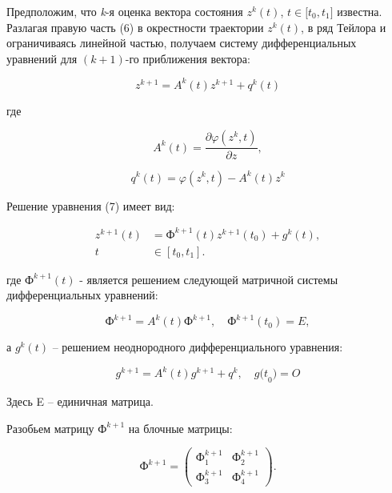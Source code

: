 \begin{multicols}{2}
Предположим, что \emph{k}-я оценка вектора состояния
\(z^{k}(t)\),
\(t \in \lbrack t_{0},t_{1}\rbrack\) известна. Разлагая правую часть (6)
в окрестности траектории \(z^{k}(t)\), в ряд
Тейлора и ограничиваясь линейной частью, получаем систему
дифференциальных уравнений для \((k + 1)\)-го приближения вектора:

\begin{equation}
{z}^{k + 1} = A^{k}(t)z^{k + 1} + q^{k}(t)
\end{equation}

где

\begin{equation*}
A^{k}(t) = \frac{\partial\varphi(z^{k},t)}{\partial z},
\end{equation*}

\begin{equation*}
q^{k}(t) = \varphi\left( z^{k},t \right) - A^{k}(t)z^{k}
\end{equation*}

Решение уравнения (7) имеет вид:

\begin{equation}
\begin{aligned}
z^{k + 1}(t) &= \text{Ф}^{k + 1}(t)z^{k + 1}\left( t_{0} \right) + g^{k}(t), \\
t &\in \left\lbrack t_{0}, t_{1} \right\rbrack.
\end{aligned}
\end{equation}

где \(Ф^{k + 1}(t)\) - является решением
следующей матричной системы дифференциальных уравнений:

\begin{equation}
{\text{Ф}}^{k + 1} = A^{k}(t)\text{Ф}^{k + 1},\quad \text{Ф}^{k + 1}\left( t_{0} \right) = E,
\end{equation}

а \(g^{k}(t)\) -- решением неоднородного
дифференциального уравнения:

\begin{equation}
{g}^{k + 1} = A^{k}(t)g^{k + 1} + q^{k},\quad {g(t}_{0}) = O
\end{equation}

Здесь E -- единичная матрица.

Разобьем матрицу \(\text{Ф}^{k + 1}\) на блочные
матрицы:

\[\text{Ф}^{k + 1} = \begin{pmatrix}
\text{Ф}_{1}^{k + 1} & \text{Ф}_{2}^{k + 1} \\
\text{Ф}_{3}^{k + 1} & \text{Ф}_{4}^{k + 1}
\end{pmatrix}.\]


\end{multicols}
